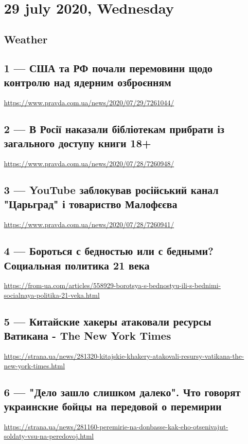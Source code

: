  

\clearpage
\section{29 july 2020, Wednesday}

\subsection{Weather}



\subsection{1 --- США та РФ почали перемовини щодо контролю над ядерним озброєнням}
\url{https://www.pravda.com.ua/news/2020/07/29/7261044/}

\subsection{2 --- В Росії наказали бібліотекам прибрати із загального доступу книги 18+}
\url{https://www.pravda.com.ua/news/2020/07/28/7260948/}

\subsection{3 --- YouTube заблокував російський канал "Царьград" і товариство Малофєєва}
\url{https://www.pravda.com.ua/news/2020/07/28/7260941/}

\subsection{4 --- Бороться с бедностью или с бедными? Социальная политика 21 века}
\url{https://from-ua.com/articles/558929-borotsya-s-bednostyu-ili-s-bednimi-socialnaya-politika-21-veka.html}

\subsection{5 --- Китайские хакеры атаковали ресурсы Ватикана - The New York Times}
\url{https://strana.ua/news/281320-kitajskie-khakery-atakovali-resursy-vatikana-the-new-york-times.html}

\subsection{6 --- "Дело зашло слишком далеко". Что говорят украинские бойцы на передовой о перемирии}
\url{https://strana.ua/news/281160-peremirie-na-donbasse-kak-eho-otsenivajut-soldaty-vsu-na-peredovoj.html}


 
